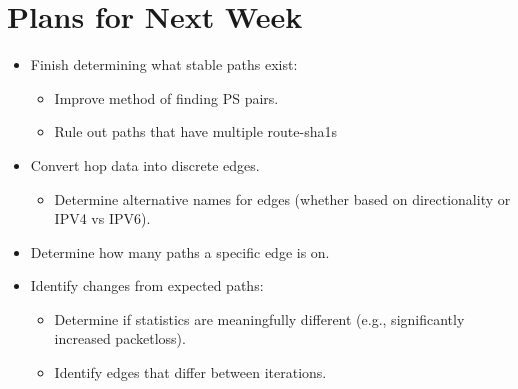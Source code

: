 \documentclass{weeklyreport}
\begin{document}
\section*{Plans for Next Week}

\begin{itemize}
	\item Finish determining what stable paths exist:
	\begin{itemize}
		\item Improve method of finding PS pairs.
		\item Rule out paths that have multiple route-sha1s
	\end{itemize}
	\item Convert hop data into discrete edges.
	\begin{itemize}
		\item Determine alternative names for edges (whether based on directionality or IPV4 vs IPV6).
	\end{itemize}
	\item Determine how many paths a specific edge is on.
	\item Identify changes from expected paths:
	\begin{itemize}
		\item Determine if statistics are meaningfully different (e.g., significantly increased packetloss).
		\item Identify edges that differ between iterations.
	\end{itemize}
\end{itemize}
\end{document}
